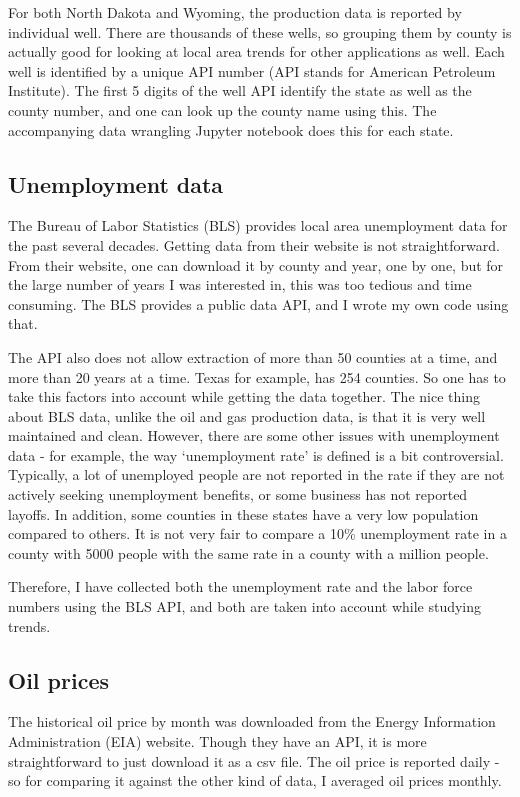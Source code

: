 \documentclass[11pt,letterpaper]{article}
\begin{document}
For both North Dakota and Wyoming, the production data is reported by individual well. There are thousands of these wells, so grouping them by county is actually good for looking at local area trends for other applications as well. Each well is identified by a unique API number (API stands for American Petroleum Institute). The first 5 digits of the well API identify the state as well as the county number, and one can look up the county name using this. The accompanying data wrangling Jupyter notebook does this for each state.
 
\subsection{Unemployment data}
The Bureau of Labor Statistics (BLS) provides local area unemployment data for the past several decades. Getting data from their website is not straightforward. From their website, one can download it by county and year, one by one, but for the large number of years I was interested in, this was too tedious and time consuming. The BLS provides a public data API, and I wrote my own code using that.

The API also does not allow extraction of more than 50 counties at a time, and more than 20 years at a time. Texas for example, has 254 counties. So one has to take this factors into account while getting the data together. The nice thing about BLS data, unlike the oil and gas production data, is that it is very well maintained and clean. However, there are some other issues with unemployment data - for example, the way `unemployment rate' is defined is a bit controversial. Typically, a lot of unemployed people are not reported in the rate if they are not actively seeking unemployment benefits, or some business has not reported layoffs. In addition, some counties in these states have a very low population compared to others. It is not very fair to compare a 10\% unemployment rate in a county with 5000 people with the same rate in a county with a million people. 

Therefore, I have collected both the unemployment rate and the labor force numbers using the BLS API, and both are taken into account while studying trends.

\subsection{Oil prices}

The historical oil price by month was downloaded from the Energy Information Administration (EIA) website. Though they have an API, it is more straightforward to just download it as a csv file. The oil price is reported daily - so for comparing it against the other kind of data, I averaged oil prices monthly.
\end{document}
